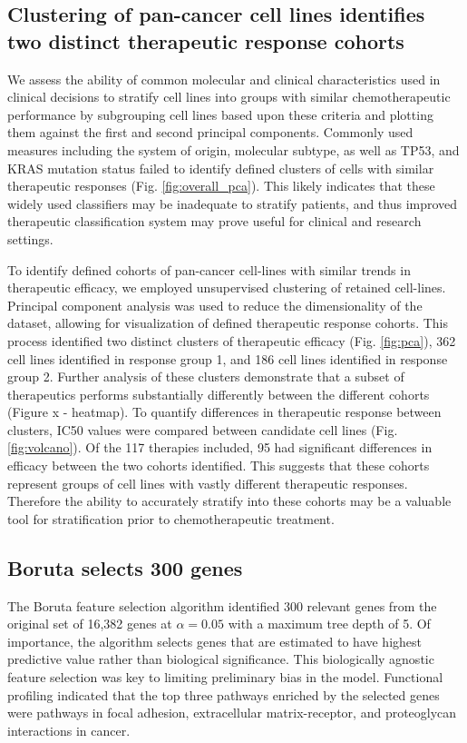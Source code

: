 \documentclass[10pt, letterpaper]{article}
\begin{document}
\begin{multicols}{2}
\subsection*{Clustering of pan-cancer cell lines identifies two distinct therapeutic response cohorts}
We assess the ability of common molecular and clinical characteristics used in clinical decisions to stratify cell lines into groups with similar chemotherapeutic performance by subgrouping cell lines based upon these criteria and plotting them against the first and second principal components. Commonly used measures including the system of origin, molecular subtype, as well as TP53, and KRAS mutation status failed to identify defined clusters of cells with similar therapeutic responses (Fig. \ref{fig:overall_pca}). This likely indicates that these widely used classifiers may be inadequate to  stratify patients, and thus improved therapeutic classification system may prove useful for clinical and research settings. 

To identify defined cohorts of pan-cancer cell-lines with similar trends in therapeutic efficacy, we employed unsupervised clustering of retained cell-lines. Principal component analysis was used to reduce the dimensionality of the dataset, allowing for visualization of defined therapeutic response cohorts. This process identified two distinct clusters of therapeutic efficacy (Fig. \ref{fig:pca}), 362 cell lines identified in response group 1, and 186 cell lines identified in response group 2.  Further analysis of these clusters demonstrate that a subset of therapeutics performs substantially differently between the different cohorts (Figure x - heatmap). To quantify differences in therapeutic response between clusters, IC50 values were compared between candidate cell lines (Fig. \ref{fig:volcano}). Of the 117 therapies included, 95 had significant differences in efficacy between the two cohorts identified. This suggests that these cohorts represent groups of cell lines with vastly different therapeutic responses. Therefore the ability to accurately stratify into these cohorts may be a valuable tool for stratification prior to chemotherapeutic treatment. 


\subsection*{Boruta selects 300 genes}
The Boruta feature selection algorithm identified 300 relevant genes from the original set of 16,382 genes at $\alpha=0.05$ with a maximum tree depth of 5. Of importance, the algorithm selects genes that are estimated to have highest predictive value rather than biological significance. This biologically agnostic feature selection was key to limiting preliminary bias in the model. Functional profiling indicated that the top three pathways enriched by the selected genes were pathways in focal adhesion, extracellular matrix-receptor, and proteoglycan interactions in cancer.



\end{multicols}
\end{document}
